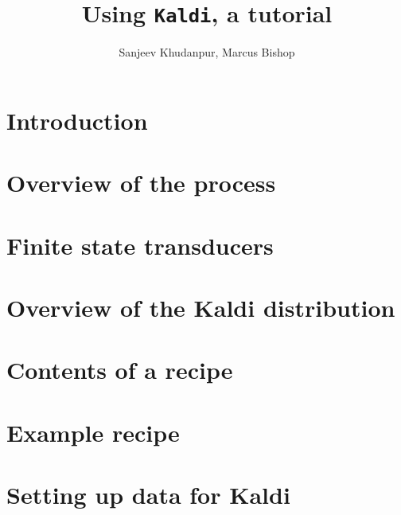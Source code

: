 \documentclass[12pt]{article}
\title{Using \texttt{Kaldi}, a tutorial}
\author{Sanjeev Khudanpur, Marcus Bishop}
\begin{document}
\maketitle

\section{Introduction}

\section{Overview of the process}

\section{Finite state transducers}

\section{Overview of the \textsf{Kaldi} distribution}

\section{Contents of a recipe}

\section{Example recipe}


\section{Setting up data for \textsf{Kaldi}}

\end{document}

